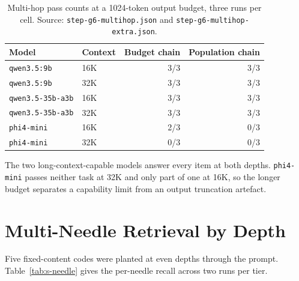 \documentclass[11pt,a4paper]{article}
\begin{document}
\begin{table}[h]
\centering\small
\caption{Multi-hop pass counts at a 1024-token output budget, three runs
per cell.  Source: \texttt{step-g6-multihop.json} and
\texttt{step-g6-multihop-extra.json}.}
\label{tab:s-multihop}
\begin{tabular}{@{}llrr@{}}
\toprule
\textbf{Model} & \textbf{Context} & \textbf{Budget chain} & \textbf{Population chain} \\
\midrule
\texttt{qwen3.5:9b}      & 16K & 3/3 & 3/3 \\
\texttt{qwen3.5:9b}      & 32K & 3/3 & 3/3 \\
\texttt{qwen3.5-35b-a3b} & 16K & 3/3 & 3/3 \\
\texttt{qwen3.5-35b-a3b} & 32K & 3/3 & 3/3 \\
\texttt{phi4-mini}       & 16K & 2/3 & 0/3 \\
\texttt{phi4-mini}       & 32K & 0/3 & 0/3 \\
\bottomrule
\end{tabular}
\end{table}

The two long-context-capable models answer every item at both depths.
\texttt{phi4-mini} passes neither task at 32K and only part of one at
16K, so the longer budget separates a capability limit from an output
truncation artefact.

\section{Multi-Needle Retrieval by Depth}

Five fixed-content codes were planted at even depths through the
prompt.  Table~\ref{tab:s-needle} gives the per-needle recall across two
runs per tier.
\end{document}
